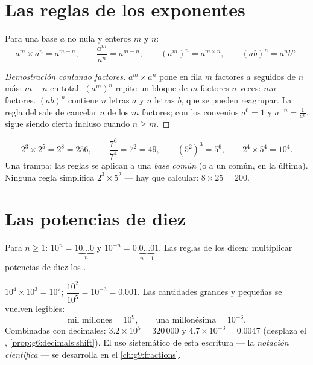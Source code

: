 \section{Las reglas de los exponentes}

\begin{theorem}\label{thm:g8:powers:rules}
Para una base $a$ no nula y  enteros $m$ y $n$:
\[
a^m \times a^n = a^{m+n},
\qquad
\frac{a^m}{a^n} = a^{m-n},
\qquad
\left(a^m\right)^n = a^{m \times n},
\qquad
(ab)^n = a^n b^n .
\]
\end{theorem}

\begin{proof}[Demostración contando factores]
$a^m \times a^n$ pone en fila $m$ factores $a$ seguidos de $n$ más:
$m + n$ en total. $\left(a^m\right)^n$ repite un bloque de $m$ factores
$n$ veces: $mn$ factores. $(ab)^n$ contiene $n$ letras $a$ y $n$
letras $b$, que se pueden reagrupar. La regla del  sale de
cancelar $n$ de los $m$ factores; con los convenios
$a^0 = 1$ y $a^{-n} = \frac{1}{a^n}$, sigue siendo cierta incluso cuando
$n \geq m$.
\end{proof}

\begin{example}\label{ex:g8:powers:rules}
\[
2^3 \times 2^5 = 2^8 = 256,
\qquad
\frac{7^6}{7^4} = 7^2 = 49,
\qquad
\left(5^2\right)^3 = 5^6,
\qquad
2^4 \times 5^4 = 10^4 .
\]
Una trampa: las reglas se aplican a una \emph{base común} (o a un
 común, en la última). Ninguna regla simplifica $2^3 \times 5^2$ ---
hay que calcular: $8 \times 25 = 200$.
\end{example}

\section{Las potencias de diez}

\begin{proposition}\label{prop:g8:powers:ten}
Para $n \geq 1$: $10^n = 1\underbrace{0\dots0}_{n}$ y
$10^{-n} = 0.\underbrace{0\dots0}_{n-1}1$. Las reglas de los 
dicen: multiplicar potencias de diez  los .
\end{proposition}

\begin{example}\label{ex:g8:powers:ten}
$10^4 \times 10^3 = 10^7$; \quad
$\dfrac{10^2}{10^5} = 10^{-3} = 0.001$. Las cantidades grandes y pequeñas
se vuelven legibles:
\[
\text{mil millones} = 10^9,
\qquad
\text{una millonésima} = 10^{-6}.
\]
Combinadas con decimales: $3.2 \times 10^5 = 320\,000$ y
$4.7 \times 10^{-3} = 0.0047$ (desplaza el ,
\cref{prop:g6:decimals:shift}). El uso sistemático de esta escritura ---
la \emph{notación científica} --- se desarrolla en el
\cref{ch:g9:fractions}.
\end{example}

